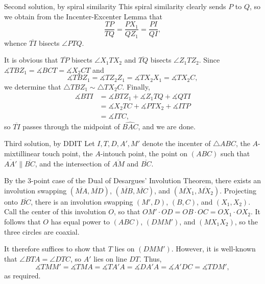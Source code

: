 \begin{customenv}{Second solution, by spiral similarity}
    This spiral similarity clearly sends $P$ to $Q$, so we obtain from the Incenter-Excenter Lemma that \[\frac{TP}{TQ}=\frac{PX_1}{QZ_1}=\frac{PI}{QI},\]
    whence $\overline{TI}$ bisects $\angle PTQ$.

    It is obvious that $\overline{TP}$ bisects $\angle X_1TX_2$ and $\overline{TQ}$ bisects $\angle Z_1TZ_2$. Since $\measuredangle TBZ_1=\measuredangle BCT=\measuredangle X_2CT$ and \[\measuredangle TBZ_1=\measuredangle TZ_2Z_1=\measuredangle TX_2X_1=\measuredangle TX_2C,\]
    we determine that $\triangle TBZ_1\sim\triangle TX_2C$. Finally,
    \begin{align*}
        \measuredangle BTI&=\measuredangle BTZ_1+\measuredangle Z_1TQ+\measuredangle QTI\\
        &=\measuredangle X_2TC+\measuredangle PTX_2+\measuredangle ITP\\
        &=\measuredangle ITC,
    \end{align*}
    so $\overline{TI}$ passes through the midpoint of $\widehat{BAC}$, and we are done. 
\end{customenv}
\begin{customenv}{Third solution, by DDIT}
    Let $I,T,D,A',M'$ denote the incenter of $\triangle ABC$, the $A$-mixtillinear touch point, the $A$-intouch point, the point on $(ABC)$ such that $\overline{AA'}\parallel\overline{BC}$, and the intersection of $\overline{AM}$ and $\overline{BC}$.

    By the $3$-point case of the Dual of Desargues' Involution Theorem, there exists an involution swapping $(\overline{MA},\overline{MD})$, $(\overline{MB},\overline{MC})$, and $(\overline{MX_1},\overline{MX_2})$. Projecting onto $\overline{BC}$, there is an involution swapping $(M',D)$, $(B,C)$, and $(X_1,X_2)$. Call the center of this involution $O$, so that $OM'\cdot OD=OB\cdot OC=OX_1\cdot OX_2$. It follows that $O$ has equal power to $(ABC)$, $(DMM')$, and $(MX_1X_2)$, so the three circles are coaxial.

    It therefore suffices to show that $T$ lies on $(DMM')$. However, it is well-known that $\angle BTA=\angle DTC$, so $A'$ lies on line $DT$. Thus, \[\measuredangle TMM'=\measuredangle TMA=\measuredangle TA'A=\measuredangle DA'A=\measuredangle A'DC=\measuredangle TDM',\]
    as required. 
\end{customenv}
